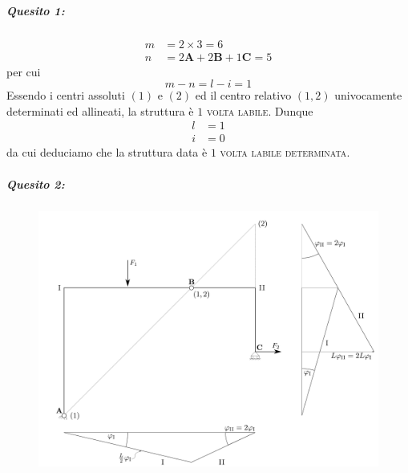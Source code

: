 \noindent \subparagraph{Quesito 1:}
\begin{align*}
m &= 2\times 3 = 6 \\
n &= 2\mathbf{A}+2\mathbf{B}+1\mathbf{C} = 5 
\end{align*}
per cui
\begin{equation*}
m-n = l-i = 1
\end{equation*}
Essendo i centri assoluti $(1)$ e $(2)$ ed il centro relativo $(1,2)$ univocamente determinati ed allineati, la struttura è $1$ \textsc{volta labile}. Dunque
\begin{align*}
l &= 1 \\
i &= 0
\end{align*}
da cui deduciamo che la struttura data è $1$ \textsc{volta labile determinata}.
\noindent \subparagraph{Quesito 2:}
\renewcommand{\thefigure}{8.3~-~2}
\begin{figure}[ht]
\centering
\includegraphics[width=\textwidth]{Immagini/Parte_8/Esercizio8_3/Esercizio8_3_2.pdf}
\caption{}
\label{Esercizio8-3-2}
\end{figure}
